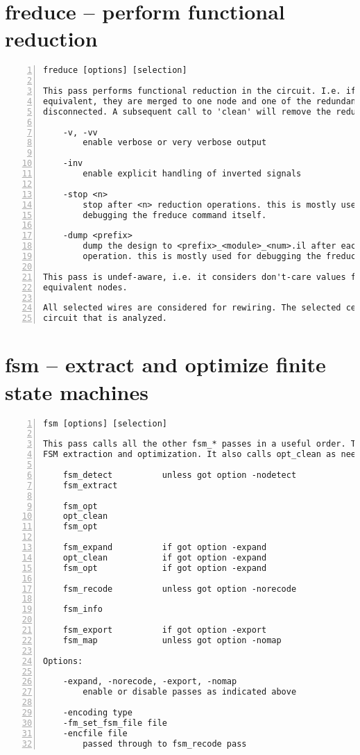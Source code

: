 \section{freduce -- perform functional reduction}
\label{cmd:freduce}
\begin{lstlisting}[numbers=left,frame=single]
    freduce [options] [selection]

This pass performs functional reduction in the circuit. I.e. if two nodes are
equivalent, they are merged to one node and one of the redundant drivers is
disconnected. A subsequent call to 'clean' will remove the redundant drivers.

    -v, -vv
        enable verbose or very verbose output

    -inv
        enable explicit handling of inverted signals

    -stop <n>
        stop after <n> reduction operations. this is mostly used for
        debugging the freduce command itself.

    -dump <prefix>
        dump the design to <prefix>_<module>_<num>.il after each reduction
        operation. this is mostly used for debugging the freduce command.

This pass is undef-aware, i.e. it considers don't-care values for detecting
equivalent nodes.

All selected wires are considered for rewiring. The selected cells cover the
circuit that is analyzed.
\end{lstlisting}

\section{fsm -- extract and optimize finite state machines}
\label{cmd:fsm}
\begin{lstlisting}[numbers=left,frame=single]
    fsm [options] [selection]

This pass calls all the other fsm_* passes in a useful order. This performs
FSM extraction and optimization. It also calls opt_clean as needed:

    fsm_detect          unless got option -nodetect
    fsm_extract

    fsm_opt
    opt_clean
    fsm_opt

    fsm_expand          if got option -expand
    opt_clean           if got option -expand
    fsm_opt             if got option -expand

    fsm_recode          unless got option -norecode

    fsm_info

    fsm_export          if got option -export
    fsm_map             unless got option -nomap

Options:

    -expand, -norecode, -export, -nomap
        enable or disable passes as indicated above

    -encoding type
    -fm_set_fsm_file file
    -encfile file
        passed through to fsm_recode pass
\end{lstlisting}

